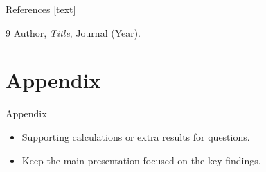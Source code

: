 \documentclass{beamer}
\begin{document}

\begin{frame}{References}
    \footnotesize
    [text]
    \begin{thebibliography}{9}
        Author, \textit{Title}, Journal (Year).
    \end{thebibliography}
\end{frame}


\appendix
\section{Appendix}

\begin{frame}{Appendix}
    \begin{itemize}
        \item Supporting calculations or extra results for questions.
        \item Keep the main presentation focused on the key findings.
    \end{itemize}
\end{frame}
\end{document}
